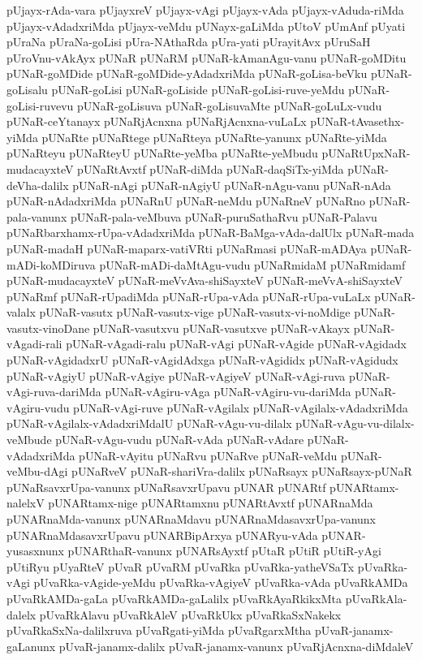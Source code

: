 {pUjayx-rAda-vara
pUjayxreV
pUjayx-vAgi
pUjayx-vAda
pUjayx-vAduda-riMda
pUjayx-vAdadxriMda
pUjayx-veMdu
pUNayx-gaLiMda
pUtoV
pUmAnf
pUyati
pUraNa
pUraNa-goLisi
pUra-NAthaRda
pUra-yati
pUrayitAvx
pUruSaH
pUroVnu-vAkAyx
pUNaR
pUNaRM
pUNaR-kAmanAgu-vanu
pUNaR-goMDitu
pUNaR-goMDide
pUNaR-goMDide-yAdadxriMda
pUNaR-goLisa-beVku
pUNaR-goLisalu
pUNaR-goLisi
pUNaR-goLiside
pUNaR-goLisi-ruve-yeMdu
pUNaR-goLisi-ruvevu
pUNaR-goLisuva
pUNaR-goLisuvaMte
pUNaR-goLuLx-vudu
pUNaR-ceYtanayx
pUNaRjAcnxna
pUNaRjAcnxna-vuLaLx
pUNaR-tAvasethx-yiMda
pUNaRte
pUNaRtege
pUNaRteya
pUNaRte-yanunx
pUNaRte-yiMda
pUNaRteyu
pUNaRteyU
pUNaRte-yeMba
pUNaRte-yeMbudu
pUNaRtUpxNaR-mudacayxteV
pUNaRtAvxtf
pUNaR-diMda
pUNaR-daqSiTx-yiMda
pUNaR-deVha-dalilx
pUNaR-nAgi
pUNaR-nAgiyU
pUNaR-nAgu-vanu
pUNaR-nAda
pUNaR-nAdadxriMda
pUNaRnU
pUNaR-neMdu
pUNaRneV
pUNaRno
pUNaR-pala-vanunx
pUNaR-pala-veMbuva
pUNaR-puruSathaRvu
pUNaR-Palavu
pUNaRbarxhamx-rUpa-vAdadxriMda
pUNaR-BaMga-vAda-dalUlx
pUNaR-mada
pUNaR-madaH
pUNaR-maparx-vatiVRti
pUNaRmasi
pUNaR-mADAya
pUNaR-mADi-koMDiruva
pUNaR-mADi-daMtAgu-vudu
pUNaRmidaM
pUNaRmidamf
pUNaR-mudacayxteV
pUNaR-meVvAva-shiSayxteV
pUNaR-meVvA-shiSayxteV
pUNaRmf
pUNaR-rUpadiMda
pUNaR-rUpa-vAda
pUNaR-rUpa-vuLaLx
pUNaR-valalx
pUNaR-vasutx
pUNaR-vasutx-vige
pUNaR-vasutx-vi-noMdige
pUNaR-vasutx-vinoDane
pUNaR-vasutxvu
pUNaR-vasutxve
pUNaR-vAkayx
pUNaR-vAgadi-rali
pUNaR-vAgadi-ralu
pUNaR-vAgi
pUNaR-vAgide
pUNaR-vAgidadx
pUNaR-vAgidadxrU
pUNaR-vAgidAdxga
pUNaR-vAgididx
pUNaR-vAgidudx
pUNaR-vAgiyU
pUNaR-vAgiye
pUNaR-vAgiyeV
pUNaR-vAgi-ruva
pUNaR-vAgi-ruva-dariMda
pUNaR-vAgiru-vAga
pUNaR-vAgiru-vu-dariMda
pUNaR-vAgiru-vudu
pUNaR-vAgi-ruve
pUNaR-vAgilalx
pUNaR-vAgilalx-vAdadxriMda
pUNaR-vAgilalx-vAdadxriMdalU
pUNaR-vAgu-vu-dilalx
pUNaR-vAgu-vu-dilalx-veMbude
pUNaR-vAgu-vudu
pUNaR-vAda
pUNaR-vAdare
pUNaR-vAdadxriMda
pUNaR-vAyitu
pUNaRvu
pUNaRve
pUNaR-veMdu
pUNaR-veMbu-dAgi
pUNaRveV
pUNaR-shariVra-dalilx
pUNaRsayx
pUNaRsayx-pUNaR
pUNaRsavxrUpa-vanunx
pUNaRsavxrUpavu
pUNAR
pUNARtf
pUNARtamx-nalelxV
pUNARtamx-nige
pUNARtamxnu
pUNARtAvxtf
pUNARnaMda
pUNARnaMda-vanunx
pUNARnaMdavu
pUNARnaMdasavxrUpa-vanunx
pUNARnaMdasavxrUpavu
pUNARBipArxya
pUNARyu-vAda
pUNAR-yusasxnunx
pUNARthaR-vanunx
pUNARsAyxtf
pUtaR
pUtiR
pUtiR-yAgi
pUtiRyu
pUyaRteV
pUvaR
pUvaRM
pUvaRka
pUvaRka-yatheVSaTx
pUvaRka-vAgi
pUvaRka-vAgide-yeMdu
pUvaRka-vAgiyeV
pUvaRka-vAda
pUvaRkAMDa
pUvaRkAMDa-gaLa
pUvaRkAMDa-gaLalilx
pUvaRkAyaRkikxMta
pUvaRkAla-dalelx
pUvaRkAlavu
pUvaRkAleV
pUvaRkUkx
pUvaRkaSxNakekx
pUvaRkaSxNa-dalilxruva
pUvaRgati-yiMda
pUvaRgarxMtha
pUvaR-janamx-gaLanunx
pUvaR-janamx-dalilx
pUvaR-janamx-vanunx
pUvaRjAcnxna-diMdaleV
}
